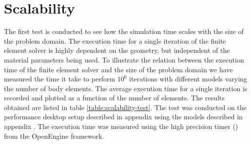 \section{Scalability}
\label{sec:time-as-a-function-of-geometry}
The first test is conducted to see how the simulation time scales with
the size of the problem domain. 
%
The execution time for a single iteration of the finite element solver is
highly dependent on the geometry, but independent of the
material parameters being used.
%
%
%
To illustrate the relation between the execution time of the finite element
solver and the size of the problem domain we have measured the time
it take to perform $10^6$ iterations with different models varying the
number of body elements. The average execution time for a single
iteration is recorded and plotted as a function of the number of
elements.
% 
The results obtained are listed
in table \vref{table:scalability-test}. The test was conducted on the
performance desktop setup described in appendix
 using the models described
in appendix .
The execution time was measured using the high precision timer
() from the OpenEngine framework.

\layoutnewpage

